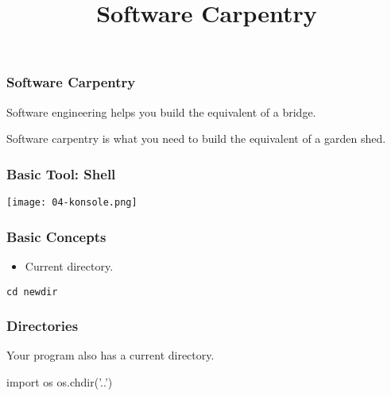 
\makeatletter
\def\verbatim@font{\small\ttfamily}
\makeatother
\title{Software Carpentry}

\frame{\maketitle}

\begin{frame}[fragile]
\frametitle{Software Carpentry}

\alert{Software engineering} helps you build the equivalent of a bridge.

\medskip

\alert{Software carpentry} is what you need to build the equivalent of a garden shed.


\end{frame}

\begin{frame}[fragile]
\frametitle{Basic Tool: Shell}

\centering
\texttt{[image: 04-konsole.png]}

\end{frame}

\begin{frame}[fragile]
\frametitle{Basic Concepts}

\begin{itemize}
\item Current directory.
\end{itemize}

\texttt{cd newdir}

\end{frame}

\begin{frame}[fragile]
\frametitle{Directories}

Your program also has a current directory.

\begin{python}
import os
os.chdir('..')
\end{python}

\end{frame}

